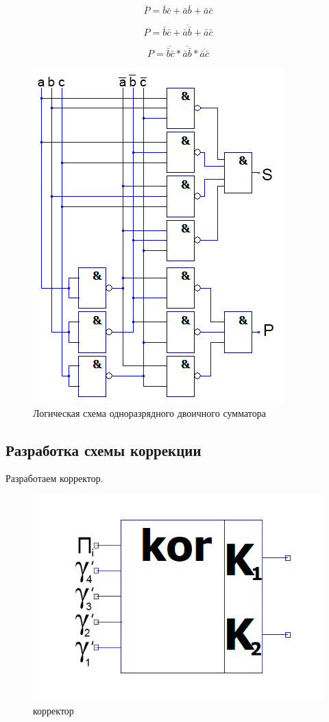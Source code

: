 \documentclass[a4paper,14pt]{article}
\begin{document}
$$\overline{P} = \bar{b}\bar{c} + \bar{a}\bar{b} + \bar{a}\bar{c}$$

$$P = \overline{ \bar{b}\bar{c} + \bar{a}\bar{b} + \bar{a}\bar{c}}$$

$$ P = \overline{ \bar{b}\bar{c}} *  \overline{ \bar{a}\bar{b}} * \overline{ \bar{a}\bar{c}}$$

\begin{figure}[H]
	\centering
	\includegraphics[width=0.6\linewidth]{images/dvSum_sh}
	\caption{Логическая схема одноразрядного двоичного сумматора}
	\label{fig:dvSum_sh}
\end{figure}

\subsection{Разработка схемы коррекции}

Разработаем корректор.

\begin{figure}[H]
	\centering
	\includegraphics[width=0.4\linewidth]{images/korr_el}
	\caption{корректор}
	\label{fig:korr_el}
\end{figure}
\end{document}
